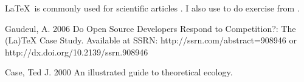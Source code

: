 \documentclass{article}
\begin{document}
\LaTeX~is commonly used for scientific articles \cite{gaudeul2006}.
I also use to do exercise from \cite{case2000}.

\begin{thebibliography}{9}

  Gaudeul, A.
  2006
  Do Open Source Developers Respond to Competition?: The (La)TeX Case Study.
  Available at SSRN: http://ssrn.com/abstract=908946 or http://dx.doi.org/10.2139/ssrn.908946

  Case, Ted J.
  2000
  An illustrated guide to theoretical ecology.

\end{thebibliography}
\end{document}
